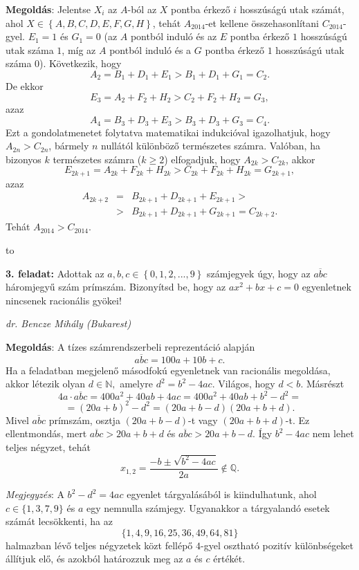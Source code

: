 \documentclass[a4paper,10pt]{article}
\newcommand{\ki}[2]{\hfill {\it #1 (#2)}\medskip}
\newcommand{\vonal}{\hbox to \hsize{\hskip2truecm\hrulefill\hskip2truecm}}
\begin{document}
{\bf Megoldás}: Jelentse $X_{i}$ az $A$-ból az $X$ pontba érkező $i$
hosszúságú utak számát, ahol $X\in\left\{
A,B,C,D,E,F,G,H\right\}$, tehát  $A_{2014}$-et kellene
összehasonlítani $C_{2014}$-gyel. $E_{1}=1$ és
$G_{1}=0$ (az $A$ pontból induló és az $E$ pontba
érkező $1$ hosszúságú utak száma $1$,
míg az $A$ pontból induló és a $G$ pontba
érkező $1$ hosszúságú utak
száma $0$). Következik, hogy $$A_{2}=B_{1}+D_{1}+E_{1}>B_{1}%
+D_{1}+G_{1}=C_{2}.$$ De ekkor $$E_{3}=A_{2}+F_{2}+H_{2}>C_{2}+F_{2}%
+H_{2}=G_{3},$$ azaz
$$A_{4}=B_{3}+D_{3}+E_{3}>B_{3}+D_{3}+G_{3}=C_{4}.$$ Ezt a
gondolatmenetet folytatva matematikai indukcióval igazolhatjuk,
hogy $A_{2n}>C_{2n}$, bármely $n$ nullától
különböző természetes számra. Valóban,
ha bizonyos $k$ természetes számra ($k\geq2$)
elfogadjuk, hogy $A_{2k}>C_{2k}$, akkor
$$E_{2k+1}=A_{2k}+F_{2k}+H_{2k}>
C_{2k}+F_{2k}+H_{2k}=G_{2k+1},$$ azaz
\begin{eqnarray*}
A_{2k+2}&=&B_{2k+1}+D_{2k+1}+E_{2k+1}>\\
&>&B_{2k+1}+D_{2k+1}+G_{2k+1}=C_{2k+2}.
\end{eqnarray*}
 Tehát $A_{2014}>C_{2014}.$

\medskip

\vonal

{\bf 3. feladat: } Adottak az $a,b,c \in \left\{ {0,1,2,...,9} \right\}$ számjegyek
úgy, hogy az $\overline {abc} $ háromjegyű szám prímszám.
Bizonyítsd be, hogy az $a{x^2} + bx + c = 0$ egyenletnek nincsenek
racionális gyökei!


\ki{dr. Bencze Mihály}{Bukarest}\medskip

{\bf Megoldás}: A tízes számrendszerbeli reprezentáció alapján
\[\overline {abc}  = 100a + 10b + c.\] Ha a feladatban megjelenő másodfokú
egyenletnek van racionális megoldása, akkor létezik olyan
$d\in \mathbb{N,}$ amelyre $d^2={b^2} - 4ac.$ Világos, hogy $d<b.$
Másrészt
 $$4a \cdot \overline {abc}  = 400{a^2} + 40ab + 4ac = 400{a^2} + 40ab + {b^2} - {d^2} = $$
 $$={\left( {20a + b} \right)^2} - {d^2} = \left( {20a + b - d} \right)\left( {20a + b + d} \right).$$
 Mivel $\overline{abc}$ prímszám, osztja $\left( {20a + b - d} \right)$-t vagy
 $\left( {20a + b + d} \right)$-t. Ez ellentmondás, mert $\overline {abc}  > 20a + b + d$ és
$\overline {abc}  > 20a + b - d.$ Így ${b^2} - 4ac$ nem lehet
teljes négyzet, tehát $${x_{1,2}} = \frac{{ - b \pm \sqrt {{b^2}
- 4ac} }}{{2a}} \notin \mathbb{Q}.$$

\medskip

\textit{Megjegyzés}: A $b^2-d^2=4ac$ egyenlet tárgyalásából is
kiindulhatunk, ahol $c\in \{1,3,7,9\}$ és $a$ egy nemnulla
számjegy. Ugyanakkor a tárgyalandó esetek számát
le\-csök\-kenti, ha az $$\{1,4,9,16,25,36,49,64,81\}$$ halmazban
lévő teljes négyzetek közt fellépő $4$-gyel osztható
po\-zi\-tív különbségeket állítjuk elő, és
azokból határozzuk meg az $a$ és $c$ értékét.
\end{document}
